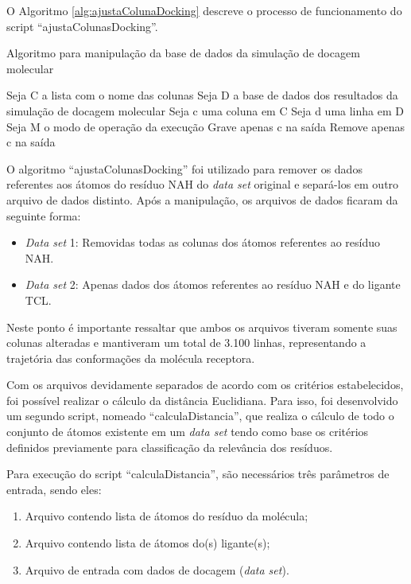 O Algoritmo \ref{alg:ajustaColunaDocking} descreve o processo de funcionamento do script ``ajustaColunasDocking''.

\begin{algorithm}[H]
\caption{Algoritmo para manipulação da base de dados da simulação de docagem molecular}
\label{alg:ajustaColunaDocking}
{\fontsize{10}{10}\selectfont
\begin{algorithmic}[1]
	\STATE Seja C a lista com o nome das colunas
	\STATE Seja D a base de dados dos resultados da simulação de docagem molecular
	\STATE Seja c uma coluna em C
	\STATE Seja d uma linha em D
	\STATE Seja M o modo de operação da execução
			\STATE Grave apenas c na saída
			\ENDFOR
		\ENDFOR
	\ENDIF
			\STATE Remove apenas c na saída
			\ENDFOR
		\ENDFOR
	\ENDIF
\end{algorithmic}
}
\end{algorithm}

O algoritmo ``ajustaColunasDocking'' foi utilizado para remover os dados referentes aos átomos do resíduo NAH do \emph{data set} original e separá-los em outro arquivo de dados distinto. Após a manipulação, os arquivos de dados ficaram da seguinte forma:
\begin{itemize}
	\item \emph{Data set} 1: Removidas todas as colunas dos átomos referentes ao resíduo NAH.
	\item \emph{Data set} 2: Apenas dados dos átomos referentes ao resíduo NAH e do ligante TCL.
\end{itemize}

Neste ponto é importante ressaltar que ambos os arquivos tiveram somente suas colunas alteradas e mantiveram um total de 3.100 linhas, representando a trajetória das conformações da molécula receptora.

Com os arquivos devidamente separados de acordo com os critérios estabelecidos, foi possível realizar o cálculo da distância Euclidiana. Para isso, foi desenvolvido um segundo script, nomeado ``calculaDistancia'', que realiza o cálculo de todo o conjunto de átomos existente em um \emph{data set} tendo como base os critérios definidos previamente para classificação da relevância dos resíduos.

Para execução do script ``calculaDistancia'', são necessários três parâmetros de entrada, sendo eles:
\begin{enumerate}
	\item Arquivo contendo lista de átomos do resíduo da molécula;
	\item Arquivo contendo lista de átomos do(s) ligante(s);
	\item Arquivo de entrada com dados de docagem (\emph{data set}).
\end{enumerate}

